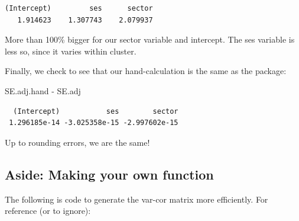 \documentclass[
  letterpaper,
  DIV=11,
  numbers=noendperiod]{scrreprt}
\newenvironment{Shaded}{}{}
\newcommand{\AttributeTok}[1]{\textcolor[rgb]{0.49,0.56,0.16}{#1}}
\newcommand{\ControlFlowTok}[1]{\textcolor[rgb]{0.00,0.44,0.13}{\textbf{#1}}}
\newcommand{\DecValTok}[1]{\textcolor[rgb]{0.25,0.63,0.44}{#1}}
\newcommand{\FunctionTok}[1]{\textcolor[rgb]{0.02,0.16,0.49}{#1}}
\newcommand{\NormalTok}[1]{#1}
\newcommand{\OtherTok}[1]{\textcolor[rgb]{0.00,0.44,0.13}{#1}}
\newcommand{\SpecialCharTok}[1]{\textcolor[rgb]{0.25,0.44,0.63}{#1}}
\begin{document}
\begin{verbatim}
(Intercept)         ses      sector 
   1.914623    1.307743    2.079937 
\end{verbatim}

More than 100\% bigger for our sector variable and intercept. The ses
variable is less so, since it varies within cluster.

Finally, we check to see that our hand-calculation is the same as the
package:

\begin{Shaded}
\begin{Highlighting}[]
\NormalTok{SE.adj.hand }\SpecialCharTok{{-}}\NormalTok{ SE.adj}
\end{Highlighting}
\end{Shaded}

\begin{verbatim}
  (Intercept)           ses        sector 
 1.296185e-14 -3.025358e-15 -2.997602e-15 
\end{verbatim}

Up to rounding errors, we are the same!

\subsection{Aside: Making your own
function}\label{aside-making-your-own-function}

The following is code to generate the var-cor matrix more efficiently.
For reference (or to ignore):

\begin{Shaded}
\end{Shaded}
\end{document}
